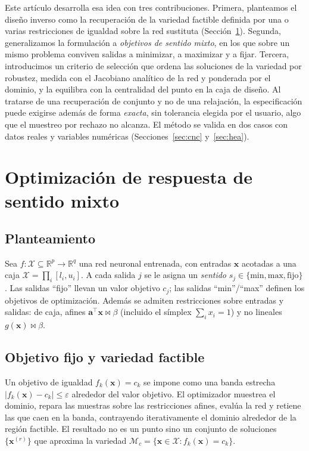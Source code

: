 \documentclass[5p,times,authoryear]{elsarticle}
\begin{document}
Este artículo desarrolla esa idea con tres contribuciones. Primera, planteamos
el diseño inverso como la recuperación de la variedad factible definida por una
o varias restricciones de igualdad sobre la red sustituta
(Sección~\ref{sec:metodo}). Segunda, generalizamos la formulación a
\emph{objetivos de sentido mixto}, en los que sobre un mismo problema conviven
salidas a minimizar, a maximizar y a fijar. Tercera, introducimos un criterio de
selección que ordena las soluciones de la variedad por robustez, medida con el
Jacobiano analítico de la red y ponderada por el dominio, y la equilibra con la
centralidad del punto en la caja de diseño. Al tratarse de una recuperación de
conjunto y no de una relajación, la especificación puede exigirse además de forma
\emph{exacta}, sin tolerancia elegida por el usuario, algo que el muestreo por rechazo
no alcanza. El método se valida en dos casos con
datos reales y variables numéricas (Secciones~\ref{sec:cnc} y~\ref{sec:hea}).

\section{Optimización de respuesta de sentido mixto}
\label{sec:metodo}

\subsection{Planteamiento}
Sea $f:\mathcal{X}\subseteq\mathbb{R}^p\to\mathbb{R}^q$ una red neuronal
entrenada, con entradas $\mathbf{x}$ acotadas a una caja
$\mathcal{X}=\prod_i[l_i,u_i]$. A cada salida $j$ se le asigna un \emph{sentido}
$s_j\in\{\text{min},\text{max},\text{fijo}\}$. Las salidas ``fijo'' llevan un
valor objetivo $c_j$; las salidas ``min''/``max'' definen los objetivos de
optimización. Además se admiten restricciones sobre entradas y salidas: de caja,
afines $\mathbf{a}^\top\mathbf{x}\bowtie\beta$ (incluido el símplex
$\sum_i x_i = 1$) y no lineales $g(\mathbf{x})\bowtie\beta$.

\subsection{Objetivo fijo y variedad factible}
Un objetivo de igualdad $f_k(\mathbf{x})=c_k$ se impone como una banda estrecha
$|f_k(\mathbf{x})-c_k|\le\varepsilon$ alrededor del valor objetivo. El
optimizador muestrea el dominio, repara las muestras sobre las restricciones
afines, evalúa la red y retiene las que caen en la banda, contrayendo
iterativamente el dominio alrededor de la región factible. El resultado no es un
punto sino un conjunto de soluciones $\{\mathbf{x}^{(r)}\}$ que aproxima la
variedad $\mathcal{M}_c=\{\mathbf{x}\in\mathcal{X}: f_k(\mathbf{x})=c_k\}$.
\end{document}
